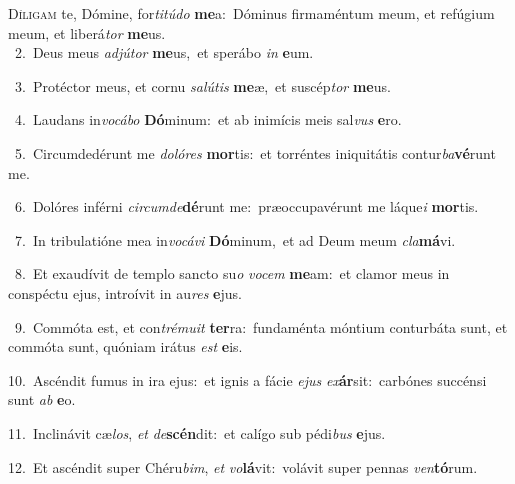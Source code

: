 \lettrine{\initial\textcolor{\initialcolor}{D}}{íligam} te, Dómine, for\-\textit{ti}\-\textit{tú}\textit{do} \textbf{me}\-a:~\star Dóminus firmaméntum meum, et refúgium meum, et liberá\textit{tor} \textbf{me}\-us.\\
{\numbfont\textcolor{\numbcolor}{~2.}}~Deus meus \textit{ad}\-\textit{jú}\textit{tor} \textbf{me}\-us,~\star et sperábo \textit{in} \textbf{e}\-um.\par
{\numbfont\textcolor{\numbcolor}{~3.}}~Protéctor meus, et cornu \textit{sa}\-\textit{lú}\textit{tis} \textbf{me}\-æ,~\star et suscép\textit{tor} \textbf{me}\-us.\par
{\numbfont\textcolor{\numbcolor}{~4.}}~Laudans in\-\textit{vo}\-\textit{cá}\textit{bo} \textbf{Dó}\-minum:~\star et ab inimícis meis sal\textit{vus} \textbf{e}\-ro.\par
{\numbfont\textcolor{\numbcolor}{~5.}}~Circumdedérunt me \textit{do}\-\textit{ló}\textit{res} \textbf{mor}\-tis:~\star et torréntes iniquitátis contur\-\textit{ba}\-\textbf{vé}runt me.\par
{\numbfont\textcolor{\numbcolor}{~6.}}~Dolóres inférni \textit{cir}\-\textit{cum}\textit{de}\textbf{dé}runt me:~\star præoccupavérunt me láque\textit{i} \textbf{mor}\-tis.\par
{\numbfont\textcolor{\numbcolor}{~7.}}~In tribulatióne mea in\-\textit{vo}\-\textit{cá}\textit{vi} \textbf{Dó}\-minum,~\star et ad Deum meum \textit{cla}\-\textbf{má}vi.\par
{\numbfont\textcolor{\numbcolor}{~8.}}~Et exaudívit de templo sancto su\textit{o} \textit{vo}\-\textit{cem} \textbf{me}\-am:~\star et clamor meus in conspéctu ejus, introívit in au\textit{res} \textbf{e}\-jus.\par
{\numbfont\textcolor{\numbcolor}{~9.}}~Commóta est, et con\-\textit{tré}\-\textit{mu}\textit{it} \textbf{ter}\-ra:~\star fundaménta móntium conturbáta sunt, et commóta sunt, quóniam irátus \textit{est} \textbf{e}\-is.\par
{\numbfont\textcolor{\numbcolor}{10.}}~Ascéndit fumus in ira ejus:~\dagger et ignis a fácie \textit{e}\-\textit{jus} \textit{ex}\-\textbf{ár}sit:~\star carbónes succénsi sunt \textit{ab} \textbf{e}\-o.\par
{\numbfont\textcolor{\numbcolor}{11.}}~Inclinávit cæ\-\textit{los}\-, \textit{et} \textit{de}\-\textbf{scén}dit:~\star et calígo sub pédi\textit{bus} \textbf{e}\-jus.\par
{\numbfont\textcolor{\numbcolor}{12.}}~Et ascéndit super Chéru\-\textit{bim}\-, \textit{et} \textit{vo}\-\textbf{lá}vit:~\star volávit super pennas \textit{ven}\-\textbf{tó}rum.\par
